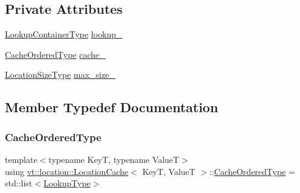 \subsection*{Private Attributes}
\begin{DoxyCompactItemize}
\item 
\hyperlink{structvt_1_1location_1_1_location_cache_af56948d938dcc38705b777a96b3100be}{Lookup\+Container\+Type} \hyperlink{structvt_1_1location_1_1_location_cache_a66ca0e925c2fe39cbe1f309159094c96}{lookup\+\_\+}
\item 
\hyperlink{structvt_1_1location_1_1_location_cache_aee11ea8af838d172e1834a9d0293b28d}{Cache\+Ordered\+Type} \hyperlink{structvt_1_1location_1_1_location_cache_a5bc8fbc8010517ed45b022633af26de9}{cache\+\_\+}
\item 
\hyperlink{namespacevt_1_1location_ab1c4c5849012a23eee2fbd1fce6159d7}{Location\+Size\+Type} \hyperlink{structvt_1_1location_1_1_location_cache_ad0073d311deb0afe733c3d35f1f7f912}{max\+\_\+size\+\_\+}
\end{DoxyCompactItemize}


\subsection{Member Typedef Documentation}
\mbox{\label{structvt_1_1location_1_1_location_cache_aee11ea8af838d172e1834a9d0293b28d}} 
\subsubsection{\texorpdfstring{Cache\+Ordered\+Type}{CacheOrderedType}}
{\footnotesize\ttfamily template$<$typename KeyT, typename ValueT$>$ \\
using \hyperlink{structvt_1_1location_1_1_location_cache}{vt\+::location\+::\+Location\+Cache}$<$ KeyT, ValueT $>$\+::\hyperlink{structvt_1_1location_1_1_location_cache_aee11ea8af838d172e1834a9d0293b28d}{Cache\+Ordered\+Type} =  std\+::list$<$\hyperlink{structvt_1_1location_1_1_location_cache_a8a5ea74b02aaaa77820bf2504bda1175}{Lookup\+Type}$>$}

\mbox{\label{structvt_1_1location_1_1_location_cache_af56948d938dcc38705b777a96b3100be}} 
